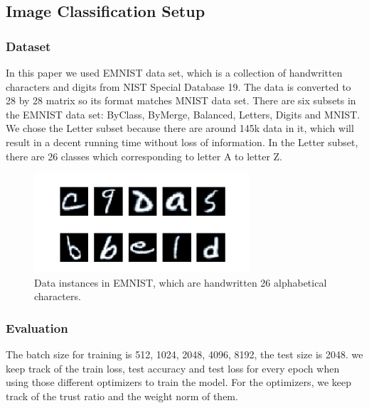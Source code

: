 

\subsection{Image Classification Setup}





\subsubsection{Dataset}

In this paper we used EMNIST \cite{emnist} data set, which is a collection of handwritten characters and digits from NIST Special Database 19. The data is converted to 28 by 28 matrix so its format matches MNIST data set. There are six subsets in the EMNIST data set: ByClass, ByMerge, Balanced, Letters, Digits and MNIST. We chose the Letter subset because there are around 145k data in it, which will result in a decent running time without loss of information. In the Letter subset, there are 26 classes which corresponding to letter A to letter Z.
\begin{figure}[htp]
    \centering
    \includegraphics[width=8cm]{img/EMNIST.png}
    \caption{Data instances in EMNIST, which are handwritten 26 alphabetical characters.}
    \label{fig:EMNIST}
\end{figure}



\subsubsection{Evaluation}



The batch size for training is {512, 1024, 2048, 4096, 8192}, the test size is 2048. we keep track of the train loss, test accuracy and test loss for every epoch when using those different optimizers to train the model. For the optimizers, we keep track of the trust ratio and the weight norm of them.




